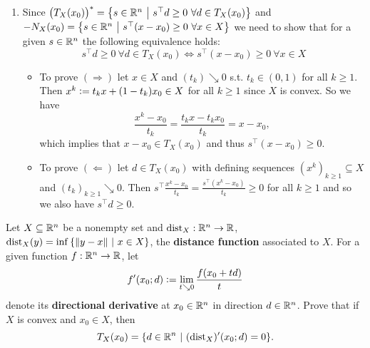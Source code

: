 \begin{solution}
\begin{enumerate}
        \item Since \(\big(T_X(x_0)\big)^* = \left\{ s \in \mathbb{R}^n \ \middle| \ s^\top d \ge 0 \ \forall d \in T_X(x_0) \right\}\) and \(- N_X(x_0) = \left\{ s \in \mathbb{R}^n \ \middle| \ s^\top (x-x_0) \ge 0 \ \forall x \in X \right\}\) we need to show that for a given \(s \in \mathbb{R}^n\) the following equivalence holds: \[s^\top d \ge 0 \ \forall d \in T_X(x_0) \iff s^\top (x - x_0) \ge 0 \ \forall x \in X \]
        \begin{itemize}
            \item To prove \((\Rightarrow)\) let \(x \in X\) and \((t_k) \searrow 0\) s.t. \(t_k \in (0, 1)\) for all \(k \ge 1\). Then \(x^k \mathrel{\mathop:}= t_k x + (1-t_k) x_0 \in X\) for all \(k \ge 1\) since \(X\) is convex. So we have \[\frac{x^k - x_0}{t_k} = \frac{t_k x - t_k x_0}{t_k} = x - x_0,\] which implies that \(x - x_0 \in T_X(x_0)\) and thus \(s^\top (x - x_0) \ge 0\).
            \item To prove \((\Leftarrow)\) let \(d \in T_X(x_0)\) with defining sequences \((x^k)_{k \ge 1} \subseteq X\) and \((t_k)_{k \ge 1} \searrow 0\). Then \(s^\top \frac{x^k - x_0}{t_k} = \frac{s^\top (x^k - x_0)}{t_k} \ge 0\) for all \(k \ge 1\) and so we also have \(s^\top d \ge 0\).
        \end{itemize}
    \end{enumerate}
\end{solution}

\begin{problem}
    Let \(X \subseteq \mathbb{R}^n\) be a nonempty set and \(\operatorname{dist}_X : \mathbb{R}^n \to \mathbb{R}\), \(\operatorname{dist}_X(y) = \inf\left\{ \left\| y-x \right\| \ \middle| \ x \in X \right\}\), the \textbf{distance function} associated to \(X\). For a given function \(f : \mathbb{R}^n \to \mathbb{R}\), let
    \[f'(x_0;d) \mathrel{\mathop:}= \lim_{t \searrow 0} \frac{f(x_0 + t d)}{t}\]
    denote its \textbf{directional derivative} at \(x_0 \in \mathbb{R}^n\) in direction \(d \in \mathbb{R}^n\). Prove that if \(X\) is convex and \(x_0 \in X\), then
    \[T_X(x_0) = \{ d \in \R^n \ | \ (\dist_X)'(x_0;d) = 0 \}.\]
\end{problem}

\begin{solution}
    
\end{solution}

